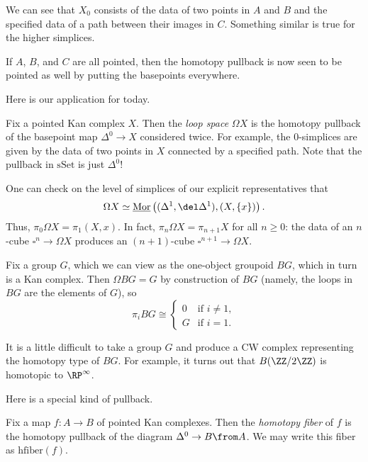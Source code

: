 \documentclass[../notes.tex]{subfiles}
\begin{document}
\begin{example}
	We can see that $X_0$ consists of the data of two points in $A$ and $B$ and the specified data of a path between their images in $C$. Something similar is true for the higher simplices.
\end{example}
\begin{remark}
	If $A$, $B$, and $C$ are all pointed, then the homotopy pullback is now seen to be pointed as well by putting the basepoints everywhere.
\end{remark}
Here is our application for today.
\begin{example}
	Fix a pointed Kan complex $X$. Then the \textit{loop space} $\Omega X$ is the homotopy pullback of the basepoint map $\Delta^0\to X$ considered twice. For example, the $0$-simplices are given by the data of two points in $X$ connected by a specified path. Note that the pullback in $\mathrm{sSet}$ is just $\Delta^0$!
\end{example}
\begin{remark}
	One can check on the level of simplices of our explicit representatives that
	\[\Omega X\simeq\underline{\mathrm{Mor}}\left((\Delta^1,\del\Delta^1),(X,\{x\})\right).\]
	Thus, $\pi_0\Omega X=\pi_1(X,x)$. In fact, $\pi_n\Omega X=\pi_{n+1}X$ for all $n\ge0$: the data of an $n$-cube $\square^n\to\Omega X$ produces an $(n+1)$-cube $\square^{n+1}\to\Omega X$. 
\end{remark}
\begin{example}
	Fix a group $G$, which we can view as the one-object groupoid $BG$, which in turn is a Kan complex. Then $\Omega BG=G$ by construction of $BG$ (namely, the loops in $BG$ are the elements of $G$), so
	\[\pi_iBG\cong\begin{cases}
		0 & \text{if }i\ne1, \\
		G & \text{if }i=1.
	\end{cases}\]
\end{example}
\begin{remark}
	It is a little difficult to take a group $G$ and produce a CW complex representing the homotopy type of $BG$. For example, it turns out that $B(\ZZ/2\ZZ)$ is homotopic to $\RP^\infty$.
\end{remark}
Here is a special kind of pullback.
\begin{definition}
	Fix a map $f\colon A\to B$ of pointed Kan complexes. Then the \textit{homotopy fiber} of $f$ is the homotopy pullback of the diagram $\Delta^0\to B\from A$. We may write this fiber as $\mathrm{hfiber}(f)$.
\end{definition}
\end{document}
